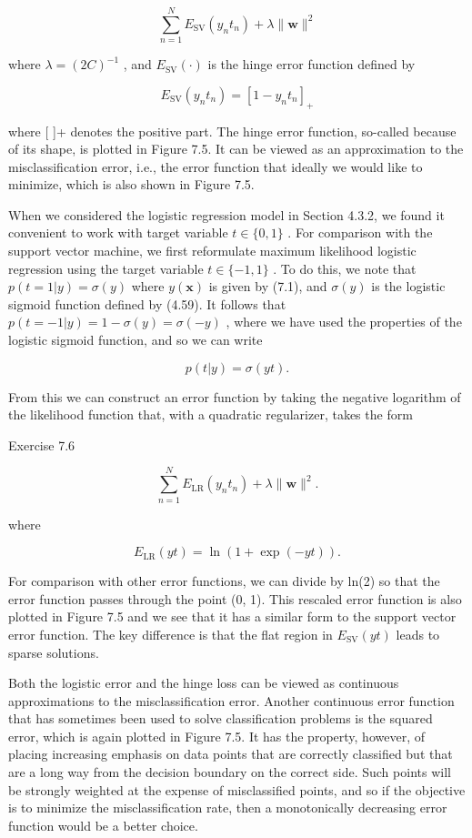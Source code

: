 \documentclass[
  10
]{article}
\begin{document}
\[
\sum_ {n = 1} ^ {N} E _ {\mathrm{SV}} (y _ {n} t _ {n}) + \lambda \| \mathbf {w} \| ^ {2}\tag{7.44}
\]

where \(\lambda = ( 2 C ) ^ { - 1 }\) , and
\(E _ { \mathrm { S V } } ( \cdot )\) is the hinge error function
defined by

\[
E _ {\mathrm{SV}} (y _ {n} t _ {n}) = [ 1 - y _ {n} t _ {n} ] _ {+}\tag{7.45}
\]

where {[} {]}+ denotes the positive part. The hinge error function,
so-called because of its shape, is plotted in Figure 7.5. It can be
viewed as an approximation to the misclassification error, i.e., the
error function that ideally we would like to minimize, which is also
shown in Figure 7.5.

When we considered the logistic regression model in Section 4.3.2, we
found it convenient to work with target variable \(t \in \{ 0 , 1 \}\) .
For comparison with the support vector machine, we first reformulate
maximum likelihood logistic regression using the target variable
\(t \in \{ - 1 , 1 \}\) . To do this, we note that
\(p ( t = 1 | y ) = \sigma ( y )\) where \(y ( \mathbf x )\) is given by
(7.1), and \(\sigma ( y )\) is the logistic sigmoid function defined by
(4.59). It follows that
\(p ( t = - 1 | y ) = 1 - \sigma ( y ) = \sigma ( - y )\) , where we
have used the properties of the logistic sigmoid function, and so we can
write

\[
p (t | y) = \sigma (y t).\tag{7.46}
\]

From this we can construct an error function by taking the negative
logarithm of the likelihood function that, with a quadratic regularizer,
takes the form

Exercise 7.6

\[
\sum_ {n = 1} ^ {N} E _ {\mathrm{LR}} (y _ {n} t _ {n}) + \lambda \| \mathbf {w} \| ^ {2}.\tag{7.47}
\]

where

\[
E _ {\mathrm{LR}} (y t) = \ln \left(1 + \exp (- y t)\right).\tag{7.48}
\]

For comparison with other error functions, we can divide by ln(2) so
that the error function passes through the point (0, 1). This rescaled
error function is also plotted in Figure 7.5 and we see that it has a
similar form to the support vector error function. The key difference is
that the flat region in \(E _ { \mathrm { S V } } ( y t )\) leads to
sparse solutions.

Both the logistic error and the hinge loss can be viewed as continuous
approximations to the misclassification error. Another continuous error
function that has sometimes been used to solve classification problems
is the squared error, which is again plotted in Figure 7.5. It has the
property, however, of placing increasing emphasis on data points that
are correctly classified but that are a long way from the decision
boundary on the correct side. Such points will be strongly weighted at
the expense of misclassified points, and so if the objective is to
minimize the misclassification rate, then a monotonically decreasing
error function would be a better choice.
\end{document}
